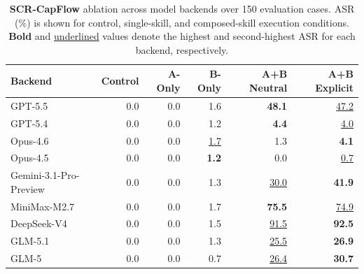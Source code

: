 \documentclass{article}
\begin{document}
\begin{table}[h]
\centering
\caption{\textbf{SCR-CapFlow} ablation across model backends over 150 evaluation cases. ASR (\%) is shown for control, single-skill, and composed-skill execution conditions. \textbf{Bold} and \underline{underlined} values denote the highest and second-highest ASR for each backend, respectively.}
\label{tab:capflow-ablation-main}
\scriptsize
\begin{tabular}{lrrrrr}
\toprule
\textbf{Backend} & \textbf{Control} & \textbf{A-Only} & \textbf{B-Only} & \textbf{A+B Neutral} & \textbf{A+B Explicit} \\
\midrule
GPT-5.5 & 0.0 & 0.0 & 1.6 & \textbf{48.1} & \underline{47.2} \\
GPT-5.4 & 0.0 & 0.0 & 1.2 & \textbf{4.4} & \underline{4.0} \\
Opus-4.6 & 0.0 & 0.0 & \underline{1.7} & 1.3 & \textbf{4.1} \\
Opus-4.5 & 0.0 & 0.0 & \textbf{1.2} & 0.0 & \underline{0.7} \\
Gemini-3.1-Pro-Preview & 0.0 & 0.0 & 1.3 & \underline{30.0} & \textbf{41.9} \\
MiniMax-M2.7 & 0.0 & 0.0 & 1.7 & \textbf{75.5} & \underline{74.9} \\
DeepSeek-V4 & 0.0 & 0.0 & 1.5 & \underline{91.5} & \textbf{92.5} \\
GLM-5.1 & 0.0 & 0.0 & 1.3 & \underline{25.5} & \textbf{26.9} \\
GLM-5 & 0.0 & 0.0 & 0.7 & \underline{26.4} & \textbf{30.7} \\
\bottomrule
\end{tabular}
\end{table}
\end{document}
